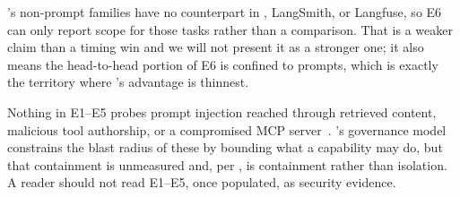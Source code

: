  \sys's non-prompt families
have no counterpart in \mlflow{}, LangSmith, or Langfuse, so E6 can only report
scope for those tasks rather than a comparison. That is a weaker claim than a
timing win and we will not present it as a stronger one; it also means the
head-to-head portion of E6 is confined to prompts, which is exactly the territory
where \sys's advantage is thinnest.

 Nothing in E1--E5 probes prompt
injection reached through retrieved content, malicious tool authorship, or a
compromised MCP server~\cite{greshake2023injection}. \sys's governance model
constrains the blast radius of these by bounding what a capability may do, but that
containment is unmeasured and, per , is containment rather
than isolation. A reader should not read E1--E5, once populated, as security
evidence.
